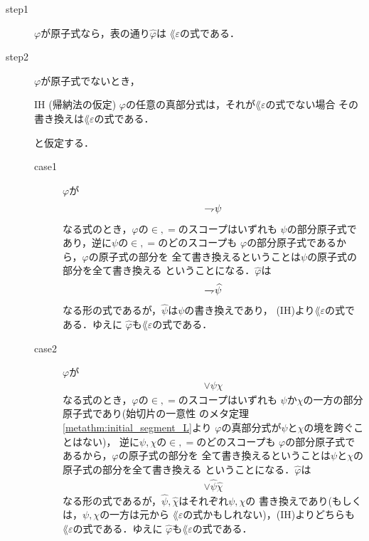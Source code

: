 	\begin{metaprf}\mbox{}
		\begin{description}
			\item[step1] $\varphi$が原子式なら，表の通り$\widehat{\varphi}$は
				$\lang{\varepsilon}$の式である．
			
			\item[step2] $\varphi$が原子式でないとき，
				\begin{itembox}[l]{IH (帰納法の仮定)}
					$\varphi$の任意の真部分式は，それが$\lang{\varepsilon}$の式でない場合
					その書き換えは$\lang{\varepsilon}$の式である．
				\end{itembox}
				と仮定する．
				\begin{description}
					\item[case1] $\varphi$が
						\begin{align}
							\rightharpoondown\hspace{-0.25em} \psi
						\end{align}
						なる式のとき，$\varphi$の$\in,=$のスコープはいずれも
						$\psi$の部分原子式であり，逆に$\psi$の$\in,=$のどのスコープも
						$\varphi$の部分原子式であるから，$\varphi$の原子式の部分を
						全て書き換えるということは$\psi$の原子式の部分を全て書き換える
						ということになる．$\widehat{\varphi}$は
						\begin{align}
							\rightharpoondown\hspace{-0.25em} \widehat{\psi}
						\end{align}
						なる形の式であるが，$\widehat{\psi}$は$\psi$の書き換えであり，
						(IH)より$\lang{\varepsilon}$の式である．ゆえに
						$\widehat{\varphi}$も$\lang{\varepsilon}$の式である．
						
					\item[case2] $\varphi$が
						\begin{align}
							\vee \psi \chi
						\end{align}
						なる式のとき，$\varphi$の$\in,=$のスコープはいずれも
						$\psi$か$\chi$の一方の部分原子式であり(始切片の一意性
						のメタ定理\ref{metathm:initial_segment_L}より
						$\varphi$の真部分式が$\psi$と$\chi$の境を跨ぐことはない)，
						逆に$\psi,\chi$の$\in,=$のどのスコープも
						$\varphi$の部分原子式であるから，$\varphi$の原子式の部分を
						全て書き換えるということは$\psi$と$\chi$の原子式の部分を全て書き換える
						ということになる．$\widehat{\varphi}$は
						\begin{align}
							\vee \widehat{\psi} \widehat{\chi}
						\end{align}
						なる形の式であるが，$\widehat{\psi},\widehat{\chi}$はそれぞれ$\psi,\chi$の
						書き換えであり(もしくは，$\psi,\chi$の一方は元から
						$\lang{\varepsilon}$の式かもしれない)，(IH)よりどちらも
						$\lang{\varepsilon}$の式である．ゆえに
						$\widehat{\varphi}$も$\lang{\varepsilon}$の式である．
						

\end{description}
\end{description}
\end{metaprf}
